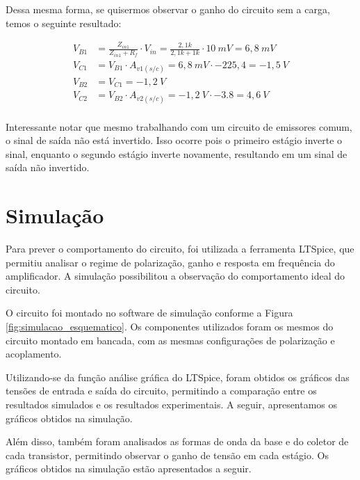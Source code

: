 Dessa mesma forma, se quisermos observar o ganho do circuito sem a carga, temos o seguinte resultado:

\begin{align}
    V_{B1} &= \frac{Z_{in1}}{Z_{in1} + R_f} \cdot V_{in} = \frac{2,1k}{2,1k + 1k} \cdot 10~mV = 6,8~mV \\
    V_{C1} &= V_{B1} \cdot A_{v1(s/c)} = 6,8~mV \cdot - 225,4 = -1,5~V \\
    V_{B2} &= V_{C1} = -1,2~V \\
    V_{C2} &= V_{B2} \cdot A_{v2(s/c)} = -1,2~V \cdot - 3.8 = 4,6~V \\
\end{align}

Interessante notar que mesmo trabalhando com um circuito de emissores comum, o sinal de saída não está invertido. Isso ocorre pois o primeiro estágio inverte o sinal, enquanto o segundo estágio inverte novamente, resultando em um sinal de saída não invertido.

\section{Simulação}

Para prever o comportamento do circuito, foi utilizada a ferramenta LTSpice, que permitiu analisar o regime de polarização, ganho e resposta em frequência do amplificador. A simulação possibilitou a observação do comportamento ideal do circuito.

O circuito foi montado no software de simulação conforme a Figura \ref{fig:simulacao_esquematico}. Os componentes utilizados foram os mesmos do circuito montado em bancada, com as mesmas configurações de polarização e acoplamento.


Utilizando-se da função análise gráfica do LTSpice, foram obtidos os gráficos das tensões de entrada e saída do circuito, permitindo a comparação entre os resultados simulados e os resultados experimentais. A seguir, apresentamos os gráficos obtidos na simulação.


Além disso, também foram analisados as formas de onda da base e do coletor de cada transistor, permitindo observar o ganho de tensão em cada estágio. Os gráficos obtidos na simulação estão apresentados a seguir.

